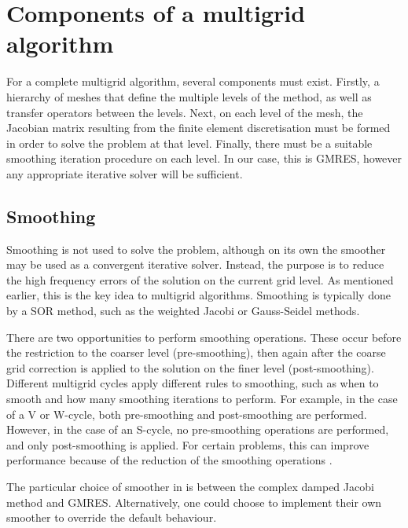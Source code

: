







\section{Components of a multigrid algorithm}

For a complete multigrid algorithm, several components must exist.
Firstly, a hierarchy of meshes that define the multiple levels of the method, as well as transfer operators between the levels.
Next, on each level of the mesh, the Jacobian matrix resulting from the finite element discretisation must be formed in order to solve the problem at that level.
Finally, there must be  a suitable smoothing iteration procedure on each level.
In our case, this is GMRES, however any appropriate iterative solver will be sufficient.



\subsection{Smoothing}

Smoothing is not used to solve the problem, although on its own the smoother may be used as a convergent iterative solver.
Instead, the purpose is to reduce the high frequency errors of the solution on the current grid level.
As mentioned earlier, this is the key idea to multigrid algorithms.
Smoothing is typically done by a SOR method, such as the weighted Jacobi or Gauss-Seidel methods.

There are two opportunities to perform smoothing operations.
These occur before the restriction to the coarser level (pre-smoothing), then again after the coarse grid correction is applied to the solution on the finer level (post-smoothing).
Different multigrid cycles apply different rules to smoothing, such as when to smooth and how many smoothing iterations to perform.
For example, in the case of a V or W-cycle, both pre-smoothing and post-smoothing are performed.
However, in the case of an S-cycle, no pre-smoothing operations are performed, and only post-smoothing is applied.
For certain problems, this can improve performance because of the reduction of the smoothing operations \cite{iyengar}.

The particular choice of smoother in \oomph is between the complex damped Jacobi method and GMRES.
Alternatively, one could choose to implement their own smoother to override the default behaviour.




